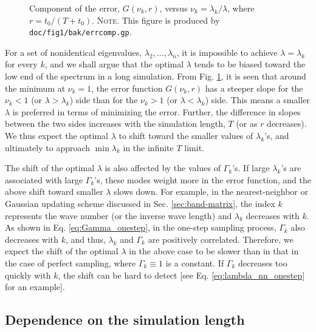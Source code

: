 \documentclass[reprint, floatfix]{revtex4-1}
\newcommand{\note}[1]{{\color{DarkGreen}\footnotesize \textsc{Note.} #1}}
\begin{document}
\begin{figure}[h]
\begin{center}
  \caption{
    \label{fig:err_component}
    Component of the error, $G(\nu_k, r)$,
    versus $\nu_k = \lambda_k / \lambda$,
    where $r = t_0 / (T + t_0)$.
    \note{This figure is produced by
      \texttt{doc/fig1/bak/errcomp.gp}.
    }
  }
\end{center}
\end{figure}



For a set of nonidentical eigenvalues,
$\lambda_2, \dots, \lambda_n$,
it is impossible to achieve $\lambda = \lambda_k$
for every $k$,
and we shall argue that
the optimal $\lambda$
tends to be biased toward
the low end of the spectrum
in a long simulation.
%
From Fig. \ref{fig:err_component},
it is seen that around the minimum at $\nu_k = 1$,
the error function $G(\nu_k, r)$
has a steeper slope for the $\nu_k < 1$
(or $\lambda > \lambda_k$) side
than for the $\nu_k > 1$ (or $\lambda < \lambda_k$) side.
%
This means a smaller $\lambda$ is preferred
in terms of minimizing the error.
%
Further, the difference in slopes
between the two sides increases
with the simulation length, $T$
(or as $r$ decreases).
%
We thus expect the optimal $\lambda$
to shift toward the smaller values of $\lambda_k$'s,
and ultimately to approach $\min \lambda_k$
in the infinite $T$ limit.

The shift of the optimal $\lambda$
is also affected by the values of $\Gamma_k$'s.
%
If large $\lambda_k$'s are associated with
large $\Gamma_k$'s,
these modes weight more in the error function,
and the above shift toward smaller $\lambda$
slows down.
%
For example,
in the nearest-neighbor or Gaussian updating scheme
discussed in Sec. \ref{sec:band-matrix},
the index $k$ represents the wave number
(or the inverse wave length)
and $\lambda_k$ decreases with $k$.
%
As shown in Eq. \eqref{eq:Gamma_onestep},
in the one-step sampling process,
$\Gamma_k$ also decreases with $k$,
and thus, $\lambda_k$ and $\Gamma_k$
are positively correlated.
%
Therefore, we expect the shift of the optimal $\lambda$
in the above case
to be slower than in that in the case of perfect sampling,
where $\Gamma_k \equiv 1$ is a constant.
%
If $\Gamma_k$ decreases too quickly with $k$,
the shift can be hard to detect
[see Eq. \eqref{eq:lambda_nn_onestep} for an example].


\subsection{\label{sec:invt_deplength}
Dependence on the simulation length}
\end{document}
